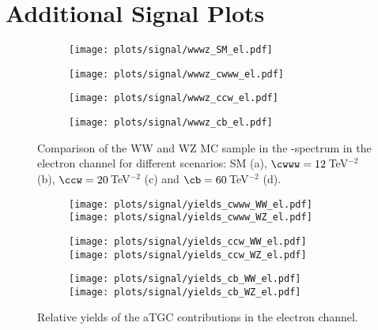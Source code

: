 \clearpage
\section{Additional Signal Plots}

\begin{figure}[b]
	\centering
	\begin{subfigure}{0.45\textwidth}
		\texttt{[image: plots/signal/wwwz\_SM\_el.pdf]}
		\caption{}
	\end{subfigure}
	\begin{subfigure}{0.45\textwidth}
		\texttt{[image: plots/signal/wwwz\_cwww\_el.pdf]}
		\caption{}
	\end{subfigure}
	\begin{subfigure}{0.45\textwidth}
		\texttt{[image: plots/signal/wwwz\_ccw\_el.pdf]}
		\caption{}
	\end{subfigure}
	\begin{subfigure}{0.45\textwidth}
		\texttt{[image: plots/signal/wwwz\_cb\_el.pdf]}
		\caption{}
	\end{subfigure}
	\caption[Comparison of the WW and WZ MC sample in the \Mpr -spectrum in the electron channel]{Comparison of the WW and WZ MC sample in the \Mpr -spectrum in the electron channel for different scenarios: SM (a), $\cwww=12$\,TeV$^{-2}$ (b), $\ccw=20$\,TeV$^{-2}$ (c) and $\cb=60$\,TeV$^{-2}$ (d). }
	\label{fig:signal:wwwz_comp_el}
\end{figure}

\begin{figure}
	\centering
	\begin{subfigure}{\textwidth}
		\texttt{[image: plots/signal/yields\_cwww\_WW\_el.pdf]}
		\texttt{[image: plots/signal/yields\_cwww\_WZ\_el.pdf]}
	\end{subfigure}
	\begin{subfigure}{\textwidth}
		\texttt{[image: plots/signal/yields\_ccw\_WW\_el.pdf]}
		\texttt{[image: plots/signal/yields\_ccw\_WZ\_el.pdf]}
	\end{subfigure}
	\begin{subfigure}{\textwidth}
		\texttt{[image: plots/signal/yields\_cb\_WW\_el.pdf]}
		\texttt{[image: plots/signal/yields\_cb\_WZ\_el.pdf]}
	\end{subfigure}
	\caption[Relative yields of the aTGC contributions in the electron channel]{Relative yields of the aTGC contributions in the electron channel.}
	\label{fig:app:atgcyields_el}
\end{figure}
		
